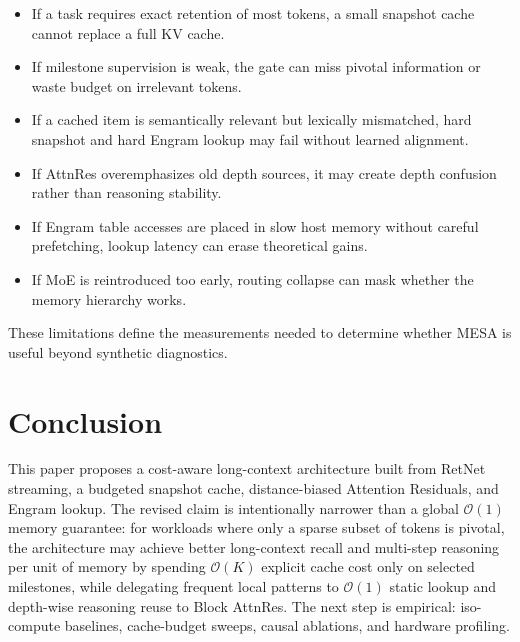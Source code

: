 \documentclass[11pt]{article}
\newcommand{\Oh}{\mathcal{O}}
\begin{document}
\begin{itemize}
    \item If a task requires exact retention of most tokens, a small snapshot cache cannot replace a full KV cache.
    \item If milestone supervision is weak, the gate can miss pivotal information or waste budget on irrelevant tokens.
    \item If a cached item is semantically relevant but lexically mismatched, hard snapshot and hard Engram lookup may fail without learned alignment.
    \item If AttnRes overemphasizes old depth sources, it may create depth confusion rather than reasoning stability.
    \item If Engram table accesses are placed in slow host memory without careful prefetching, lookup latency can erase theoretical gains.
    \item If MoE is reintroduced too early, routing collapse can mask whether the memory hierarchy works.
\end{itemize}

These limitations define the measurements needed to determine whether MESA is useful beyond synthetic diagnostics.

\section{Conclusion}

This paper proposes a cost-aware long-context architecture built from RetNet streaming, a budgeted snapshot cache, distance-biased Attention Residuals, and Engram lookup. The revised claim is intentionally narrower than a global $\Oh(1)$ memory guarantee: for workloads where only a sparse subset of tokens is pivotal, the architecture may achieve better long-context recall and multi-step reasoning per unit of memory by spending $\Oh(K)$ explicit cache cost only on selected milestones, while delegating frequent local patterns to $\Oh(1)$ static lookup and depth-wise reasoning reuse to Block AttnRes. The next step is empirical: iso-compute baselines, cache-budget sweeps, causal ablations, and hardware profiling.
\end{document}

